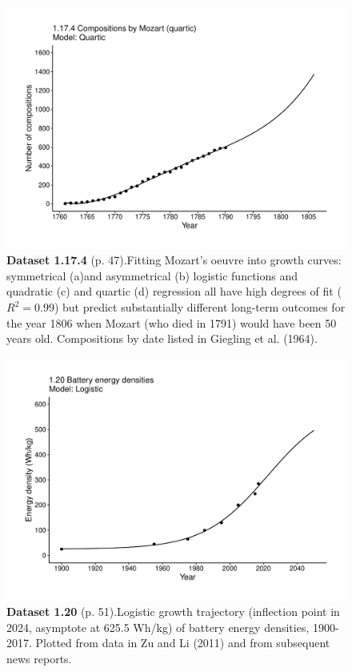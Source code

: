 \documentclass[aps,rmp,preprint,superscriptaddress,10pt,onecolumn]{article}
\begin{document}
\clearpage
\begin{figure}[h]
\includegraphics[width=\textwidth]{output/figs-ggplot/1.17.4.pdf}
\caption*{\textbf{Dataset 1.17.4} (p. 47).Fitting Mozart's oeuvre into growth curves: symmetrical (a)and asymmetrical (b) logistic functions and quadratic (c) and quartic (d) regression all have high degrees of fit ($R^2=0.99$) but predict substantially different long-term outcomes for the year 1806 when Mozart (who died in 1791) would have been 50 years old. Compositions by date listed in Giegling et al. (1964).}
\end{figure}
	
\clearpage
\begin{figure}[h]
\includegraphics[width=\textwidth]{output/figs-ggplot/1.20.pdf}
\caption*{\textbf{Dataset 1.20} (p. 51).Logistic growth trajectory (inflection point in 2024, asymptote at 625.5 Wh/kg) of battery energy densities, 1900-2017. Plotted from data in Zu and Li (2011) and from subsequent news reports. }
\end{figure}
	
\end{document}
